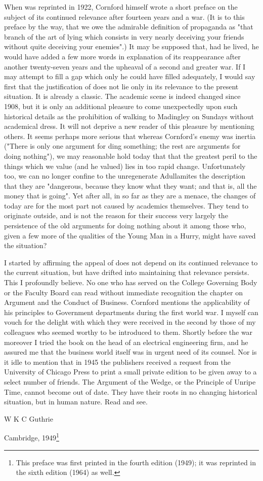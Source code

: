 When \ma was reprinted in 1922, Cornford himself wrote a short preface on the subject of its continued relevance after fourteen years and a war. (It is to this preface by the way, that we owe the admirable definition of propaganda as "that branch of the art of lying which consists in very nearly deceiving your friends without quite deceiving your enemies".) It may be supposed that, had he lived, he would have added a few more words in explanation of its reappearance after another twenty-seven years and the upheaval of a second and greater war. If I may attempt to fill a gap which only he could have filled adequately, I would say first that the justification of \mashort does not lie only in its relevance to the present situation. It is al\-ready a classic. The academic scene is indeed changed since 1908, but it is only an additional pleasure to come unexpectedly upon such historical details as the prohibition of walking to Madingley on Sundays without academical dress. It will not deprive a new reader of this pleasure by mentioning others. It seems perhaps more serious that whereas Cornford's enemy was inertia ("There is only one argument for ding something; the rest are arguments for doing nothing"), we may reasonable hold today that that the greatest peril to the things which we value (and he valued) lies in too rapid change. Unfortunately too, we can no longer confine to the unregenerate Adullamites the description that they are "dangerous, because they know what they want; and that is, all the money that is going". Yet after all, in so far as  they are a menace, the changes of today are for the most part not caused by academics themselves. They tend to originate outside, and is not the reason for their success very largely the persistence of the old arguments for doing nothing about it among those who, given a few more of the qualities of the Young Man in a Hurry, might have saved the situation?

I started by affirming the appeal of \mashort does not depend on its continued relevance to the current situation, but have drifted into maintaining that relevance persists. This I profoundly believe. No one who has served on the College Governing Body or the Faculty Board can read without immediate recognition the chapter on Argument and the Conduct of Business. Cornford mentions the applicability of his principles to Government departments during the first world war. I myself can vouch for the delight with which they were received in the second by those of my colleagues who seemed worthy to be introduced to them. Shortly before the war moreover I tried the book on the head of an electrical engineering firm, and he assured me that the business world itself was in urgent need of its counsel. Nor is it idle to mention that in 1945 the publishers received a request from the University of Chicago Press to print a small private edition to be given away to a select number of friends. The Argument of the Wedge, or the Principle of Unripe Time, cannot become out of date. They have their roots in no changing historical situation, but in human nature. Read and see.

\begin{flushright}
	W K C Guthrie
\end{flushright}

Cambridge, 1949\footnote{This preface was first printed in the fourth edition (1949); it was reprinted in the sixth edition (1964) as well.}